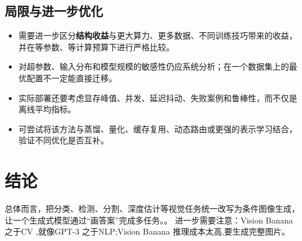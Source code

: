 \documentclass[UTF8,11pt,a4paper]{ctexart}
\newcommand{\term}[1]{\textbf{\textcolor{mainblue}{#1}}}
\begin{document}
\subsection{局限与进一步优化}
\begin{itemize}
\item 需要进一步区分\term{结构收益}与更大算力、更多数据、不同训练技巧带来的收益，并在等参数、等计算预算下进行严格比较。
\item 对超参数、输入分布和模型规模的敏感性仍应系统分析；在一个数据集上的最优配置不一定能直接迁移。
\item 实际部署还要考虑显存峰值、并发、延迟抖动、失败案例和鲁棒性，而不仅是离线平均指标。
\item 可尝试将该方法与蒸馏、量化、缓存复用、动态路由或更强的表示学习结合，验证不同优化是否互补。
\end{itemize}

\section{结论}
总体而言，把分类、检测、分割、深度估计等视觉任务统一改写为条件图像生成，让一个生成式模型通过“画答案”完成多任务。。 进一步需要注意：Vision Banana 之于CV ,就像GPT-3 之于NLP;Vision Banana 推理成本太高,要生成完整图片。
\end{document}
